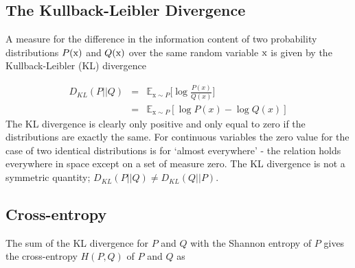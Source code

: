 \documentclass[twocolumn]{article}
\numberwithin{equation}{section}
\begin{document}



\subsection{The Kullback-Leibler Divergence}\label{appendix:kl_div_section}

A measure for the difference in the information content of two probability distributions $P(\textup{x})$ and $Q(\textup{x})$ over the same random variable $\textup{x}$ is given by the Kullback-Leibler (KL) divergence 

\begin{eqnarray}
  D_{KL}(P||Q) &=& \mathbb{E}_{\text{x}\sim P} \bigg [\log \frac{P(x)}{Q(x)} \bigg ]\nonumber \\ 
               &=& \mathbb{E}_{\text{x}\sim P} [\log P(x) - \log Q(x)]  %
\end{eqnarray}
The KL divergence is clearly only positive and only equal to zero if the distributions are exactly the same. For continuous variables the zero value for the case of two identical distributions is for `almost everywhere' - the relation holds everywhere in space except on a set of measure zero. The KL divergence is not a symmetric quantity; $D_{KL}(P||Q) \neq  D_{KL}(Q||P)$.



\subsection{Cross-entropy}\label{appendix:cross_entropy}
The sum of the KL divergence for $P$ and $Q$ with the Shannon entropy of $P$ gives the cross-entropy $H(P,Q)$ of $P$ and $Q$ as
\end{document}
